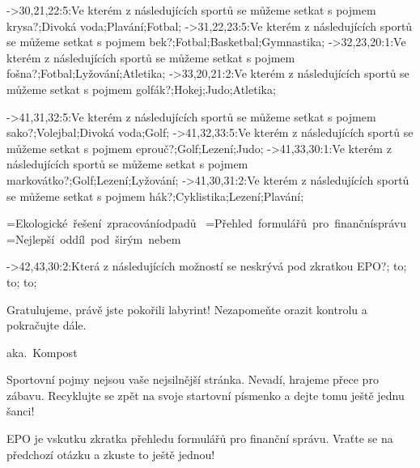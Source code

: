 ->30,21,22:5:Ve kterém z následujících sportů se může\-me setkat s pojmem {\questionfontit krysa}?;Divoká voda;Plavání;Fotbal;%
->31,22,23:5:Ve kterém z následujících sportů se může\-me setkat s pojmem {\questionfontit bek}?;Fotbal;Basketbal;Gymnastika;%
->32,23,20:1:Ve kterém z následujících sportů se může\-me setkat s pojmem {\questionfontit fošna}?;Fotbal;Lyžování;Atletika;%
->33,20,21:2:Ve kterém z následujících sportů se může\-me setkat s pojmem {\questionfontit golfák}?;Hokej;Judo;Atletika;%

->41,31,32:5:Ve kterém z následujících sportů se může\-me setkat s pojmem {\questionfontit sako}?;Volejbal;Divoká voda;Golf;%
->41,32,33:5:Ve kterém z následujících sportů se může\-me setkat s pojmem {\questionfontit eprouč}?;Golf;Lezení;Judo;%
->41,33,30:1:Ve kterém z následujících sportů se může\-me setkat s pojmem {\questionfontit markovátko}?;Golf;Lezení;Lyžování;%
->41,30,31:2:Ve kterém z následujících sportů se může\-me setkat s pojmem {\questionfontit hák}?;Cyklistika;Lezení;Plavání;%

=\vbox{\questionfont\baselineskip=40pt\hbox{Ekologické řešení zpracování}\hbox{odpadů}\hbox{~}}
=\vbox{\questionfont\baselineskip=40pt\hbox{Přehled formulářů pro finanční}\hbox{správu}\hbox{~}}
=\vbox{\questionfont\baselineskip=40pt\hbox{Nejlepší oddíl pod širým nebem}\hbox{~}}

->42,43,30:2:Která z následujících možností se {\questionfontit neskrý\-vá} pod zkratkou {\questionfontit EPO}?;{ \vbox to};{ \vbox to};{ \vbox to};%


%


%
%
\centerline{\topletterfont{}}
\vskip2cm
\baselineskip=50pt
{\finishfont Gratulujeme, právě jste po\-ko\-ři\-li labyrint! Nezapomeňte o\-ra\-zit kontrolu a pokračujte dále.}
\footing


%
%
\centerline{\topletterfont{}}
\vskip2cm
\centerline{\kompostfont aka.\ Kompost}
\vskip2cm
\baselineskip=40pt
{\questionfont Sportovní pojmy nejsou vaše nej\-sil\-nější stránka. Nevadí, hra\-je\-me přece pro zá\-ba\-vu. Re\-cyk\-luj\-te se zpět na svoje startovní písmenko a dejte tomu ještě jed\-nu šanci!}
\footing


%
%
\centerline{\topletterfont{}}
\vskip2cm
\baselineskip=40pt
{\questionfont EPO je vskutku zkratka přehledu for\-mu\-lá\-řů pro finanční správu. Vraťte se na předchozí otázku a zkuste to ještě jed\-nou!}
\footing


%
%
\bye
